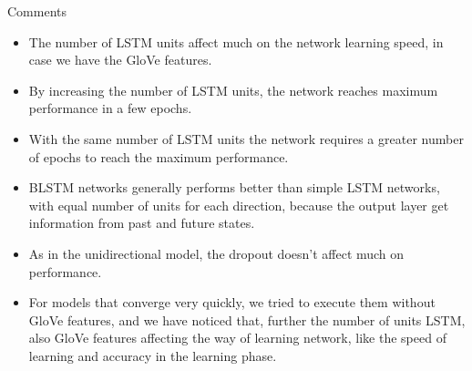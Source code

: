 \documentclass{beamer}
\begin{document}
\begin{frame}{Comments}
	\begin{itemize}
		\item The number of LSTM units affect much on the network learning speed, in case we have the GloVe features.
		\item By increasing the number of LSTM units, the network reaches maximum performance in a few epochs.
		\item With the same number of LSTM units the network requires a greater number of epochs to reach the maximum performance.
		\item BLSTM networks generally performs better than simple LSTM networks, with equal number of units for each direction, because the output layer get information from past and future states.
		\item As in the unidirectional model, the dropout doesn't affect much on performance.
		\item For models that converge very quickly, we tried to execute them without GloVe features, and we have noticed that, further the number of units LSTM, also GloVe features affecting the way of learning network, like the speed of learning and accuracy in the learning phase.
	\end{itemize}
\end{frame}

\end{document}
